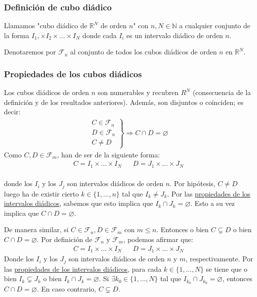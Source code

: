 \documentclass[12pt,a4paper]{article}
\newcommand{\R}{\mathbb{R}}
\newcommand{\N}{\mathbb{N}}
\newcounter{unit}[section]
\newcounter{chapter}[unit]
\renewcommand{\theunit}{\arabic{unit}}
\renewcommand{\thechapter}{\arabic{chapter}}
\renewcommand{\thesubsubsection}{\theunit.\thechapter.\arabic{subsubsection}}
\newcommand{\result}[1]{%
  \subsubsection{#1}%
  \label{result:\thesubsubsection}
}
\begin{document}
\vspace{6mm}
\result{Definición de cubo diádico}
\hspace{3mm}
Llamamos "cubo diádico de $\R^N$ de orden $n$" con $n, N \in \N$ a cualquier conjunto de
la forma $I_1, \times I_2 \times \ldots \times I_N$ donde cada $I_i$ es un intervalo diádico de orden $n$.

\vspace{2mm} \noindent
Denotaremos por $\mathcal{F}_n$ al conjunto de todos los cubos diádicos de orden $n$ en $\R^N$.

\vspace{4mm}
\result{Propiedades de los cubos diádicos}
\hspace{3mm} Los cubos diádicos de orden $n$ son numerables y recubren $R^N$ (consecuencia de la definición y de los resultados anteriores).
Además, son disjuntos o coinciden; es decir:
\begin{align*}
    \left.
    \begin{array}{l}
        C \in \mathcal{F}_n \\
        D \in \mathcal{F}_n \\
        C \neq D
    \end{array}
    \right\}
    \Rightarrow C \cap D = \varnothing
\end{align*}
Como $C,D \in \mathcal{F}_m$, han de ser de la siguiente forma:
\vspace{-2mm}
\begin{align*}
    C = I_1 \times \ldots \times I_N &&
    D = J_1 \times \ldots \times J_N
\end{align*} \\[-5ex]
donde los $I_i$ y los $J_j$ son intervalos diádicos de orden $n$.
Por hipótesis, $C \neq D$ luego ha de existir cierto $k \in \{1, \ldots, n\}$
tal que $I_k \neq J_k$. Por las \hyperref[result:0.2.2]{propiedades de los intervalos diádicos},
sabemos que esto implica que $I_k \cap J_k = \varnothing$. Esto a su vez implica que $C \cap D = \varnothing $.

\vspace{4mm}
De manera similar, si $C \in \mathcal{F}_n, D \in \mathcal{F}_m$ con $m \leq n$. Entonces o bien
$C \subsetneq D$ o bien $C \cap D = \varnothing$. Por definición de $\mathcal{F}_n$ y $\mathcal{F}_m$,
podemos afirmar que:
\begin{align*}
    C = I_1 \times \ldots \times I_N  &&
    D = J_1 \times \ldots \times J_N
\end{align*}
Donde los $I_i$ y los $J_j$ son intervalos diádicos de orden $n$ y $m$, respectivamente. Por las
\hyperref[result:0.2.2]{propiedades de los intervalos diádicos}, para cada $k \in \{1, \ldots, N\}$ se tiene
que o bien $I_k \subsetneq J_k$ o bien $I_k \cap J_k = \varnothing$. Si $\exists k_0 \in \{1, \ldots, N\}$ tal que
$I_{k_0} \cap J_{k_0} = \varnothing$, entonces $C \cap D = \varnothing$. En caso contrario, $C \subsetneq D$.
\end{document}
